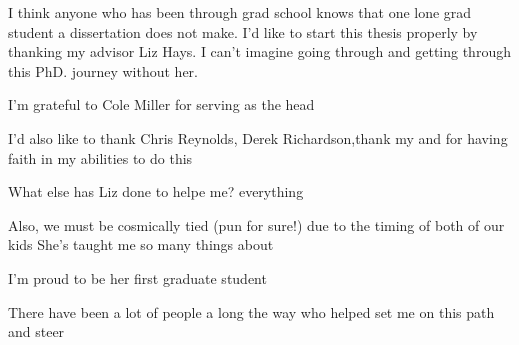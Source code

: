 
I think anyone who has been through grad school knows that one lone grad student a dissertation does not make. I'd like to start this thesis properly by thanking my advisor Liz Hays. I can't imagine going through and getting through this PhD. journey without her. 

I'm grateful to Cole Miller for serving as the head 

I'd also like to thank Chris Reynolds, Derek Richardson,thank my and for having faith in my abilities to do this 

What else has Liz done to helpe me? everything



Also, we must be cosmically tied (pun for sure!) due to the timing of both of our kids
She's taught me so many things about 

I'm proud to be her first graduate student



There have been a lot of people a long the way who helped set me on this path and steer
